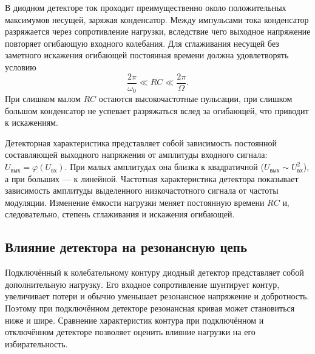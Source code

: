 В диодном детекторе ток проходит преимущественно около положительных максимумов несущей, заряжая конденсатор. Между импульсами тока конденсатор разряжается через сопротивление нагрузки, вследствие чего выходное напряжение повторяет огибающую входного колебания. Для сглаживания несущей без заметного искажения огибающей постоянная времени должна удовлетворять условию
\[
\frac{2\pi}{\omega_0}\ll RC\ll\frac{2\pi}{\Omega}.
\]
При слишком малом $RC$ остаются высокочастотные пульсации, при слишком большом конденсатор не успевает разряжаться вслед за огибающей, что приводит к искажениям.

Детекторная характеристика представляет собой зависимость постоянной составляющей выходного напряжения от амплитуды входного сигнала: $U_{\text{вых}}=\varphi(U_{\text{вх}})$. При малых амплитудах она близка к квадратичной ($U_{\text{вых}}\sim U_{\text{вх}}^2$), а при больших --- к линейной. Частотная характеристика детектора показывает зависимость амплитуды выделенного низкочастотного сигнала от частоты модуляции. Изменение ёмкости нагрузки меняет постоянную времени $RC$ и, следовательно, степень сглаживания и искажения огибающей.

\subsection{Влияние детектора на резонансную цепь}

Подключённый к колебательному контуру диодный детектор представляет собой дополнительную нагрузку. Его входное сопротивление шунтирует контур, увеличивает потери и обычно уменьшает резонансное напряжение и добротность. Поэтому при подключённом детекторе резонансная кривая может становиться ниже и шире. Сравнение характеристик контура при подключённом и отключённом детекторе позволяет оценить влияние нагрузки на его избирательность.
